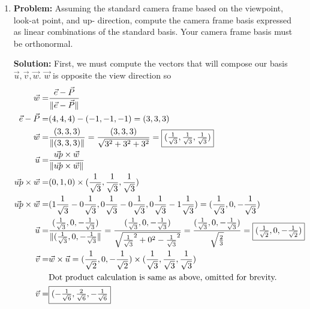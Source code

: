\documentclass[a4paper, 12pt]{article}
\newcommand{\norm}[1]{\lVert#1\rVert}
\begin{document}

\begin{enumerate}
    \item \textbf{Problem:} Assuming the standard camera frame based on the viewpoint, look-at point, and up- direction, compute the camera frame basis expressed as linear combinations of the standard basis.  Your camera frame basis must be orthonormal.

        \textbf{Solution:} First, we must compute the vectors that will compose our basis \(\vec{u}, \vec{v}, \vec{w}\).
        \(\vec{w}\) is opposite the view direction so
        \begin{align*}
        \vec{w} =& \frac{\vec{e} - \vec{P}}{\norm{\vec{e} - \vec{P}}}\\
        \vec{e} - \vec{P} =& (4,4,4) - (-1,-1,-1) = (3,3,3)\\
        \vec{w} =& \frac{(3,3,3)}{\norm{(3,3,3)}} = \frac{(3,3,3)}{\sqrt{3^2 + 3^2 + 3^2}} = \fbox{$(\frac{1}{\sqrt{3}}, \frac{1}{\sqrt{3}}, \frac{1}{\sqrt{3}})$}\\
        \vec{u} =& \frac{\vec{up} \times \vec{w}}{\norm{\vec{up} \times \vec{w}}}\\
        \vec{up} \times \vec{w} =& (0,1,0) \times (\frac{1}{\sqrt{3}}, \frac{1}{\sqrt{3}}, \frac{1}{\sqrt{3}})\\
        \vec{up} \times \vec{w} =& (1\frac{1}{\sqrt{3}} - 0\frac{1}{\sqrt{3}}, 0\frac{1}{\sqrt{3}} - 0\frac{1}{\sqrt{3}}, 0\frac{1}{\sqrt{3}} - 1\frac{1}{\sqrt{3}}) = (\frac{1}{\sqrt{3}}, 0, -\frac{1}{\sqrt{3}}) \\
        \vec{u} =& \frac{(\frac{1}{\sqrt{3}}, 0, -\frac{1}{\sqrt{3}})}{\norm{(\frac{1}{\sqrt{3}}, 0, -\frac{1}{\sqrt{3}}}} = \frac{(\frac{1}{\sqrt{3}}, 0, -\frac{1}{\sqrt{3}})}{\sqrt{\frac{1}{\sqrt{3}}^2 + 0^2 - \frac{1}{\sqrt{3}}^2}} = \frac{(\frac{1}{\sqrt{3}}, 0, -\frac{1}{\sqrt{3}})}{\sqrt{\frac{2}{3}}} = \fbox{$(\frac{1}{\sqrt{2}}, 0, -\frac{1}{\sqrt{2}})$}\\
        \vec{v} =& \vec{w} \times \vec{u} = (\frac{1}{\sqrt{2}}, 0, -\frac{1}{\sqrt{2}}) \times (\frac{1}{\sqrt{3}}, \frac{1}{\sqrt{3}}, \frac{1}{\sqrt{3}})\\
        &\text{Dot product calculation is same as above, omitted for brevity.}\\
        \vec{v} =& \fbox{$(-\frac{1}{\sqrt{6}}, \frac{2}{\sqrt{6}}, -\frac{1}{\sqrt{6}} $}\\

\end{align*}
\end{enumerate}
\end{document}
